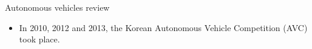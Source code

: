 \begin{frame}{Autonomous vehicles review}
{\begin{itemize}
\begin{itemize}
      \item \emph{Junior} \citep{montemerlo2008junior}, from Standford University.
      \item \emph{Odin} \citep{Bacha2008}, from Virginia Tech.
      \item \emph{Talos} \citep{leonard2007team}, from the Massachusetts Institute of Technology.
      \item \emph{Little Ben} \citep{bohren2008little}, from University of Pennsylvania.
      \item \emph{Skynet} \citep{miller2008team}, from Cornell University.
      \end{itemize}
      \item In 2010, 2012 and 2013, the Korean Autonomous Vehicle Competition (AVC) took place.
    \end{itemize}
    }
  \end{frame}

